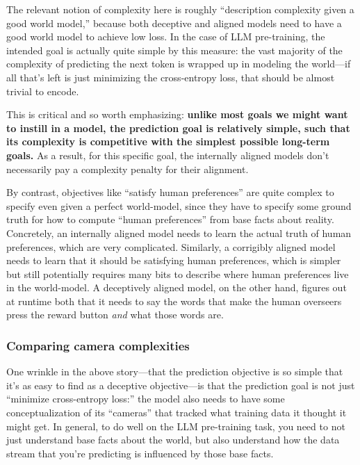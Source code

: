 \documentclass[
  twocolumn,
  natbib,
]{miri-tech-article}
\begin{document}
The relevant notion of complexity here is roughly ``description complexity given a good world model,'' because both deceptive and aligned models need to have a good world model to achieve low loss. In the case of LLM pre-training, the intended goal is actually quite simple by this measure: the vast majority of the complexity of predicting the next token is wrapped up in modeling the world---if all that's left is just minimizing the cross-entropy loss, that should be almost trivial to encode.

This is critical and so worth emphasizing: \textbf{unlike most goals we might want to instill in a model, the prediction goal is relatively simple, such that its complexity is competitive with the simplest possible long-term goals.} As a result, for this specific goal, the internally aligned models don't necessarily pay a complexity penalty for their alignment.

By contrast, objectives like ``satisfy human preferences'' are quite complex to specify even given a perfect world-model, since they have to specify some ground truth for how to compute ``human preferences'' from base facts about reality. Concretely, an internally aligned model needs to learn the actual truth of human preferences, which are very complicated. Similarly, a corrigibly aligned model needs to learn that it should be satisfying human preferences, which is simpler but still potentially requires many bits to describe where human preferences live in the world-model. A deceptively aligned model, on the other hand, figures out at runtime both that it needs to say the words that make the human overseers press the reward button \textit{and} what those words are.


\subsubsection{Comparing camera complexities}

One wrinkle in the above story---that the prediction objective is so simple that it's as easy to find as a deceptive objective---is that the prediction goal is not just ``minimize cross-entropy loss:'' the model also needs to have some conceptualization of its ``cameras'' that tracked what training data it thought it might get. In general, to do well on the LLM pre-training task, you need to not just understand base facts about the world, but also understand how the data stream that you're predicting is influenced by those base facts.
\end{document}
